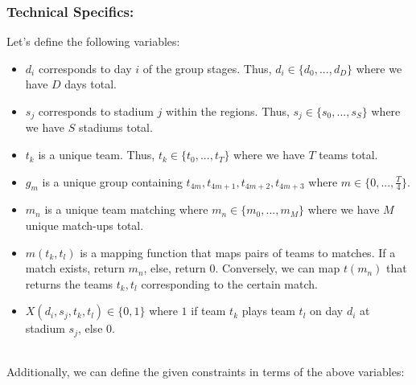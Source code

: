 \documentclass[letterpaper,10pt]{article}
\begin{document}
\newpage
\subsubsection*{Technical Specifics:} 
Let's define the following variables: 
\begin{itemize}
\item $d_i$ corresponds to day $i$ of the group stages. Thus, $d_i \in \{d_0, ..., d_D \}$ where we have $D$ days total.
\item $s_j$ corresponds to stadium $j$ within the regions. Thus, $s_j \in \{s_0, ..., s_S \}$ where we have $S$ stadiums total.
\item $t_k$ is a unique team. Thus, $t_k \in \{t_0, ..., t_T \}$ where we have $T$ teams total.
\item $g_m$ is a unique group containing $t_{4m}, t_{4m+1}, t_{4m+2}, t_{4m+3}$ where $m \in \{0, ..., \frac{T}{4} \}$.
\item $m_n$ is a unique team matching where $m_n \in \{ m_0, ..., m_M\}$ where we have $M$ unique match-ups total.
\item $m(t_k, t_l)$ is a mapping function that maps pairs of teams to matches. If a match exists, return $m_n$, else, return $0$. Conversely, we can map $t(m_n)$ that returns the teams $t_k, t_l$ corresponding to the certain match.
\item $X(d_i, s_j, t_k, t_l) \in \{0,1\}$ where $1$ if team $t_k$ plays team $t_l$ on day $d_i$ at stadium $s_j$, else $0$.

\end{itemize}
~\\
Additionally, we can define the given constraints in terms of the above variables:
\end{document}
